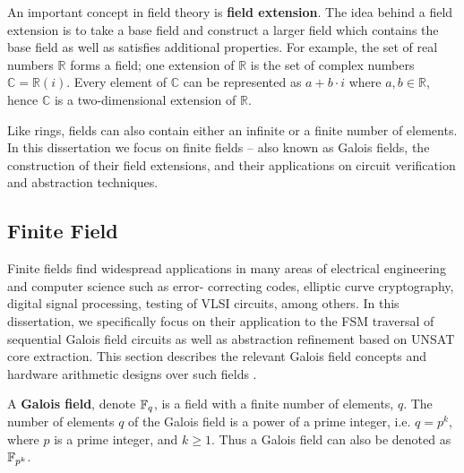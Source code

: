An important concept in field theory is {\bf field extension}. The idea behind a
field extension is to take a base field and construct a larger field which 
contains the base field as well as satisfies additional properties. For example,
the set of real numbers $\mathbb{R}$ forms a field; one extension of 
$\mathbb{R}$ is the set of complex numbers $\mathbb{C}=\mathbb{R}(i)$. Every
element of $\mathbb{C}$ can be represented as $a+b\cdot i$ where $a,b \in \mathbb{R}$,
hence $\mathbb{C}$ is a two-dimensional extension of $\mathbb{R}$.

Like rings, fields can also contain either an infinite or a finite number of 
elements. 
In this dissertation we focus on finite fields -- also known as Galois fields, 
the construction of their field extensions, and their applications on circuit verification and abstraction techniques.

\subsection{Finite Field}
Finite fields find widespread applications in 
many areas of electrical engineering and computer science such as error-
correcting codes, elliptic curve cryptography, digital signal processing, 
testing of VLSI circuits, among others.
In this dissertation, we specifically focus on their application to 
the FSM traversal of sequential Galois field circuits as well as abstraction refinement based on UNSAT core extraction.
This section describes the relevant Galois field concepts
\cite{galois_field:mceliece} \cite{ftheory:2006} \cite{ff:1997}
and hardware arithmetic designs over such fields \cite{mastro:1989} \cite{PT:1985} 
\cite{acar:1998} \cite{wu:2002} \cite{Knezevic:2008}. 


\begin{Definition} 
A {\bf Galois field}, denote ${\mathbb{F}}_{q}$, is a field with a finite
number of elements, $q$. The number of elements $q$ of the Galois field is
a power of a prime integer, i.e. $q = p^k$, where $p$ is a prime
integer, and $k \geq 1$. Thus a Galois field can also be denoted as 
${\mathbb{F}}_{p^{k}}$.
\end{Definition}

